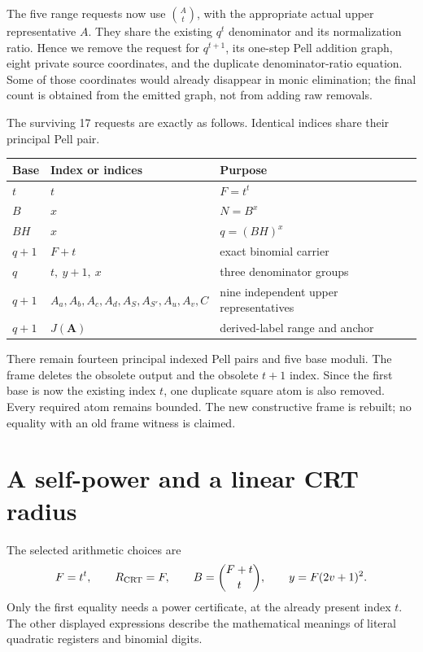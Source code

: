 \documentclass[11pt]{article}
\theoremstyle{definition}
\begin{document}
The five range requests now use $\binom{A}{t}$, with the appropriate
actual upper representative $A$. They share the existing $q^t$
denominator and its normalization ratio. Hence we remove the request
for $q^{t+1}$, its one-step Pell addition graph, eight private source
coordinates, and the duplicate denominator-ratio equation. Some of those
coordinates would already disappear in monic elimination; the final
count is obtained from the emitted graph, not from adding raw removals.

The surviving 17 requests are exactly as follows. Identical indices
share their principal Pell pair.
\begin{center}\small
\begin{tabular}{lll}
\toprule
Base & Index or indices & Purpose\\
\midrule
$t$ &$t$ &$F=t^t$\\
$B$ &$x$ &$N=B^x$\\
$BH$ &$x$ &$q=(BH)^x$\\
$q+1$ &$F+t$ &exact binomial carrier\\
$q$ &$t,\ y+1,\ x$ &three denominator groups\\
$q+1$ &$A_a,A_b,A_c,A_d,A_S,A_{S'},A_u,A_v,C$
 &nine independent upper representatives\\
$q+1$ &$J(\boldsymbol A)$ &derived-label range and anchor\\
\bottomrule
\end{tabular}
\end{center}
There remain fourteen principal indexed Pell pairs and five base
moduli. The frame deletes the obsolete output and the obsolete $t+1$
index. Since the first base is now the existing index $t$, one duplicate
square atom is also removed. Every required atom remains bounded.
The new constructive frame is rebuilt; no equality with an old frame
witness is claimed.

\section{A self-power and a linear CRT radius}
\label{sec:growth}

The selected arithmetic choices are
\begin{equation}\label{eq:selected}
F=t^t,\qquad R_{\rm CRT}=F,\qquad
B=\binom{F+t}{t},\qquad y=F(2v+1)^2.
\end{equation}
Only the first equality needs a power certificate, at the already
present index $t$. The other displayed expressions describe the
mathematical meanings of literal quadratic registers and binomial digits.
\end{document}
